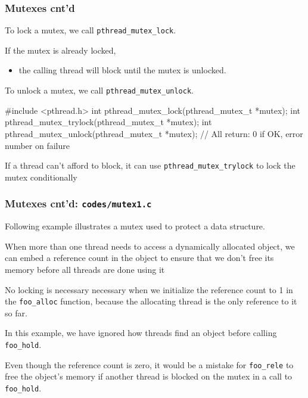 \documentclass[newPxFont,sthlmFooter,nooffset]{beamer}
\begin{document}
\begin{frame}[fragile,t]
  \frametitle{Mutexes cnt'd}
To lock a mutex, we call \texttt{pthread\_mutex\_lock}. 

If the mutex is already locked,
\begin{itemize}
\item the calling thread will block until the mutex is unlocked.
\end{itemize}
To unlock a mutex, we call \texttt{pthread\_mutex\_unlock}.
\begin{codedef}
#include <pthread.h>
int pthread_mutex_lock(pthread_mutex_t *mutex); 
int pthread_mutex_trylock(pthread_mutex_t *mutex); 
int pthread_mutex_unlock(pthread_mutex_t *mutex);
// All return: 0 if OK, error number on failure
\end{codedef}
If a thread can’t afford to block, it can use \texttt{pthread\_mutex\_trylock} to lock the mutex conditionally

\end{frame}

\begin{frame}
  \frametitle{Mutexes cnt'd: \texttt{codes/mutex1.c}}
Following example illustrates a mutex used to protect a data structure. 

When more than one thread needs to access a dynamically allocated object, we can embed a reference count in the object to ensure that we don’t free its memory before all threads are done using it

  

No locking is necessary necessary when we initialize the reference count to 1 in the \texttt{foo\_alloc} function, because the allocating thread is the only reference to it so far.

In this example, we have ignored how threads find an object before calling \texttt{foo\_hold}. 

Even though the reference count is zero, it would be a mistake for \texttt{foo\_rele} to free the object’s memory if another thread is blocked on the mutex in a call to \texttt{foo\_hold}.
\end{frame}
\end{document}
